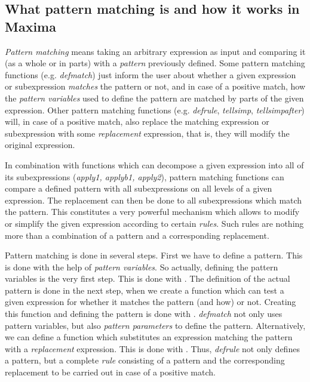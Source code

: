 \documentclass[../Maxima_Workbook.tex]{subfiles}
\begin{document}
\subsection{What pattern matching is and how it works in Maxima}\label{RP1}

\emph{Pattern matching} means taking an arbitrary expression as input and comparing it (as a whole or in parts) with a \emph{pattern} previously defined. Some pattern matching functions (e.g. \emph{defmatch}) just inform the user about whether a given expression or subexpression \emph{matches} the pattern or not, and in case of a positive match, how the \emph{pattern variables} used to define the pattern are matched by parts of the given expression. Other pattern matching functions (e.g. \emph{defrule}, \emph{tellsimp}, \emph{tellsimpafter}) will, in case of a positive match, also replace the matching expression or subexpression with some \emph{replacement} expression, that is, they will modify the original expression. 

\lz In combination with functions which can decompose a given expression into all of its subexpressions (\emph{apply1, applyb1, apply2}), pattern matching functions can compare a defined pattern with all subexpressions on all levels of a given expression. The replacement can then be done to all subexpressions which match the pattern. This constitutes a very powerful mechanism which allows to modify or simplify the given expression according to certain \emph{rules}. Such rules are nothing more than a combination of a pattern and a corresponding replacement. 

\lz Pattern matching is done in several steps. First we have to define a pattern. This is done with the help of \emph{pattern variables}. So actually, defining the pattern variables is the very first step. This is done with . The definition of the actual pattern is done in the next step, when we create a function which can test a given expression for whether it matches the pattern (and how) or not. Creating this function and defining the pattern is done with . \emph{defmatch} not only uses pattern variables, but also \emph{pattern parameters} to define the pattern. Alternatively, we can define a function which substitutes an expression matching the pattern with a \emph{replacement} expression. This is done with . Thus, \emph{defrule} not only defines a pattern, but a complete \emph{rule} consisting of a pattern and the corresponding replacement to be carried out in case of a positive match.
\end{document}
